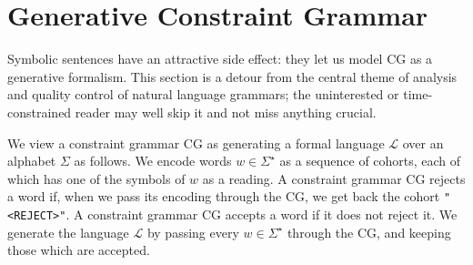 \def\t#1{\texttt{#1}}
\def\h#1{{\tt \color{gray} #1}}
\def\swf{\h{"<s>"}}
\def\maxAmb#1{$\langle \Sigma \rangle_#1$}
\def\maxAmbFSA#1{$\langle \Sigma,S \rangle_#1$}
\def\maxAmbCFG#1{$\langle \Sigma,\Sigma^{\prime} \rangle_#1$}
\def\exampleWord{{present}}


\section{Generative Constraint Grammar}
\label{sec:expressivity}

Symbolic sentences have an attractive side effect: they let us model
CG as a generative formalism. This section is a detour from the
central theme of analysis and quality control of natural language
grammars; the uninterested or time-constrained reader may well skip it
and not miss anything crucial.

We view a constraint grammar CG as generating a formal language $\mathcal{L}$
over an alphabet $\Sigma$ as follows.
We encode words $w \in \Sigma^\star$ as a sequence of cohorts, each of which has
one of the symbols of $w$ as a reading.
A constraint grammar CG rejects a word if, when we pass its encoding through the
CG, we get back the cohort \t{"<REJECT>"}. A constraint grammar CG accepts a word
if it does not reject it.
We generate the language $\mathcal{L}$ by passing every $w \in \Sigma^\star$
through the CG, and keeping those which are accepted.

